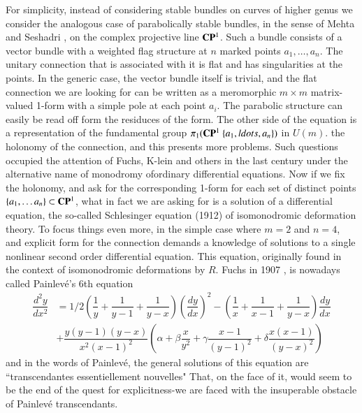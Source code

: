 For simplicity, instead of considering stable bundles on curves of higher genus we consider the analogous case of parabolically stable bundles, in the sense of Mehta and Seshadri \cite{chap7-key11}, on the complex projective line $\mathbf{C}\mathbf{P}^{1}$. Such a bundle consists of a vector bundle with a weighted flag structure at $n$ marked points $a_{1}, \ldots, a_{n}$. The unitary connection that is associated with it is flat and has singularities at the points. In the generic case, the vector bundle itself is trivial, and the flat connection we are looking for can be written as a meromorphic $m \times m$ matrix-valued 1-form with a simple pole at each point $a_{i}$. The parabolic structure can easily be read off form the residuces of the form. The other side of the equation is a representation of the fundamental group $\pi_{1}(\bC\bP^{1}\ \{a_{1}, ldots, a_{n}\})$ in $U(m)$. the holonomy of the connection, and this presents more problems. Such questions occupied the attention of Fuchs, K-lein and others in the last century under the alternative name of monodromy of\pageoriginale ordinary differential equations. Now if we fix the holonomy, and ask for the corresponding 1-form for each set of distinct points $\{a_{1}, \ldots a_{n}\}\subset \mathbf{C}\mathbf{P}^{1}$, what in fact we are asking for is a solution of a differential equation, the so-called Schlesinger equation (1912) of isomonodromic deformation theory. To focus things even more, in the simple case where $m=2$ and $n =4$, and explicit form for the connection demands a knowledge of solutions to a single nonlinear second order differential equation. This equation, originally found in the context of isomonodromic deformations by $R$. Fuchs in 1907 \cite{chap7-key4}, is nowadays called Painlev\'e's 6th equation
{\small
\begin{equation*}
\begin{split}
\dfrac{d^{2}y}{dx^{2}} & = 1/2 \left(\dfrac{1}{y} + \dfrac{1}{y-1} + \dfrac{1}{y-x}\right)\left(\dfrac{dy}{dx}\right)^{2} - \left(\dfrac{1}{x} + \dfrac{1}{x-1} + \dfrac{1}{y-x}\right) \dfrac{dy}{dx} \\
 &+ \dfrac{y(y-1)(y-x)}{x^{2}(x-1)^{2}} \left(\alpha + \beta\dfrac{x}{y^{2}} + \gamma\dfrac{x-1}{(y-1)^{2}} + \delta\dfrac{x(x-1)}{(y-x)^{2}}\right)
\end{split}
\end{equation*}
}\relax
and in the words of Painlev\'e, the general solutions of this equation are ``transcendantes essentiellement nouvelles"  That, on the face of it, would seem to be the end of the quest for explicitness-we are faced with the insuperable obstacle of Painlev\'e transcendants.

